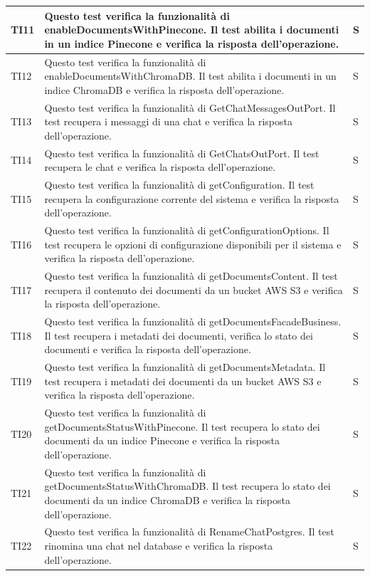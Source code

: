 \documentclass[10pt, a4paper]{article}
\begin{document}
\begin{xltabular}{\textwidth}{p{0.12\textwidth}|p{0.7\textwidth}|X}
    \hline
    TI11 & Questo test verifica la funzionalità di enableDocumentsWithPinecone. Il test abilita i documenti in un indice Pinecone e verifica la risposta dell'operazione. & S \\
    \hline
    TI12 & Questo test verifica la funzionalità di enableDocumentsWithChromaDB. Il test abilita i documenti in un indice ChromaDB e verifica la risposta dell'operazione. & S \\
    \hline
    TI13 & Questo test verifica la funzionalità di GetChatMessagesOutPort. Il test recupera i messaggi di una chat e verifica la risposta dell'operazione. & S \\
    \hline
    TI14 & Questo test verifica la funzionalità di GetChatsOutPort. Il test recupera le chat e verifica la risposta dell'operazione. & S \\
    \hline
    TI15 & Questo test verifica la funzionalità di getConfiguration. Il test recupera la configurazione corrente del sistema e verifica la risposta dell'operazione. & S \\
    \hline
    TI16 & Questo test verifica la funzionalità di getConfigurationOptions. Il test recupera le opzioni di configurazione disponibili per il sistema e verifica la risposta dell'operazione. & S \\
    \hline
    TI17 & Questo test verifica la funzionalità di getDocumentsContent. Il test recupera il contenuto dei documenti da un bucket AWS S3 e verifica la risposta dell'operazione. & S \\
    \hline
    TI18 & Questo test verifica la funzionalità di getDocumentsFacadeBusiness. Il test recupera i metadati dei documenti, verifica lo stato dei documenti e verifica la risposta dell'operazione. & S \\
    \hline
    TI19 & Questo test verifica la funzionalità di getDocumentsMetadata. Il test recupera i metadati dei documenti da un bucket AWS S3 e verifica la risposta dell'operazione. & S \\
    \hline
    TI20 & Questo test verifica la funzionalità di getDocumentsStatusWithPinecone. Il test recupera lo stato dei documenti da un indice Pinecone e verifica la risposta dell'operazione. & S \\
    \hline
    TI21 & Questo test verifica la funzionalità di getDocumentsStatusWithChromaDB. Il test recupera lo stato dei documenti da un indice ChromaDB e verifica la risposta dell'operazione. & S \\
    \hline
    TI22 & Questo test verifica la funzionalità di RenameChatPostgres. Il test rinomina una chat nel database e verifica la risposta dell'operazione. & S \\

\end{xltabular}
\end{document}
